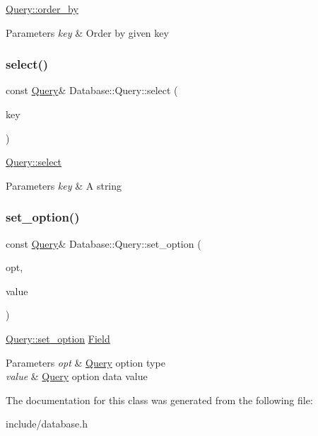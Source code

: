 \hyperlink{class_database_1_1_query_a920f38ec4ae0d11a1792e4c412506cb2}{Query\+::order\+\_\+by}


\begin{DoxyParams}{Parameters}
{\em key} & Order by given key \\
\hline
\end{DoxyParams}
\mbox{\label{class_database_1_1_query_a020ff17d626e968eb94c7f6932d375a4}} 
\subsubsection{\texorpdfstring{select()}{select()}}
{\footnotesize\ttfamily const \hyperlink{class_database_1_1_query}{Query}\& Database\+::\+Query\+::select (\begin{DoxyParamCaption}\item[{std\+::string}]{key }\end{DoxyParamCaption})}

\hyperlink{class_database_1_1_query_a020ff17d626e968eb94c7f6932d375a4}{Query\+::select}


\begin{DoxyParams}{Parameters}
{\em key} & A string \\
\hline
\end{DoxyParams}
\mbox{\label{class_database_1_1_query_a331879c9d479b94cf19c79b9b3a2eddc}} 
\subsubsection{\texorpdfstring{set\+\_\+option()}{set\_option()}}
{\footnotesize\ttfamily const \hyperlink{class_database_1_1_query}{Query}\& Database\+::\+Query\+::set\+\_\+option (\begin{DoxyParamCaption}\item[{Query\+Option\+Type}]{opt,  }\item[{\hyperlink{union_query_option_data}{Query\+Option\+Data}}]{value }\end{DoxyParamCaption})}

\hyperlink{class_database_1_1_query_a331879c9d479b94cf19c79b9b3a2eddc}{Query\+::set\+\_\+option} \hyperlink{struct_field}{Field}


\begin{DoxyParams}{Parameters}
{\em opt} & \hyperlink{class_database_1_1_query}{Query} option type \\
\hline
{\em value} & \hyperlink{class_database_1_1_query}{Query} option data value \\
\hline
\end{DoxyParams}


The documentation for this class was generated from the following file\+:\begin{DoxyCompactItemize}
\item 
include/database.\+h\end{DoxyCompactItemize}
